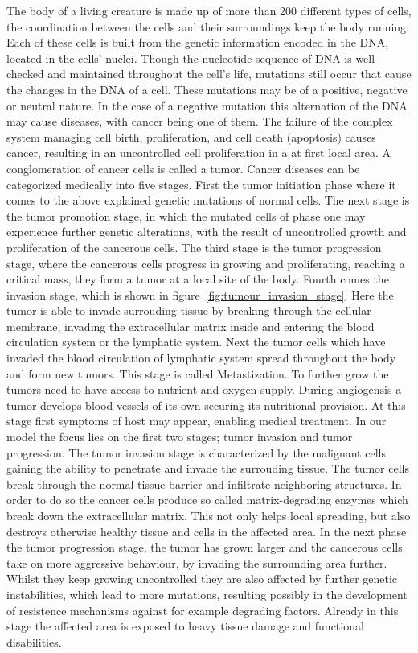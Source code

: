 The body of a living creature is made up of more than 200 different types of cells, the coordination between the cells and their surroundings keep the body running. Each of these cells is built from the genetic information encoded in the DNA, located in the cells' nuclei. Though the nucleotide sequence of DNA is well checked and maintained throughout the cell's life, mutations still occur that cause the changes in the DNA of a cell. These mutations may be of a positive, negative or neutral nature. In the case of a negative mutation this alternation of the DNA may cause diseases, with cancer being one of them. The failure of the complex system managing cell birth, proliferation, and cell death (apoptosis) causes cancer, resulting in an uncontrolled cell proliferation in a at first local area. A conglomeration of cancer cells is called a tumor. \newline
Cancer diseases can be categorized medically into five stages. First the tumor initiation phase where it comes to the above explained genetic mutations of normal cells. The next stage is the tumor promotion stage, in which the mutated cells of phase one may experience further genetic alterations, with the result of uncontrolled growth and proliferation of the cancerous cells. The third stage is the tumor progression stage, where the cancerous cells progress in growing and proliferating, reaching a critical mass, they form a tumor at a local site of the body. Fourth comes the invasion stage, which is shown in figure~\ref{fig:tumour_invasion_stage}. Here the tumor is able to invade surrouding tissue by breaking through the cellular membrane, invading the extracellular matrix inside and entering the blood circulation system or the lymphatic system. Next the tumor cells which have invaded the blood circulation of lymphatic system spread throughout the body and form new tumors. This stage is called Metastization. To further grow the tumors need to have access to nutrient and oxygen supply. During angiogensis a tumor develops blood vessels of its own securing its nutritional provision. At this stage first symptoms of host may appear, enabling medical treatment.\newline
In our model the focus lies on the first two stages; tumor invasion and tumor progression. The tumor invasion stage is characterized by the malignant cells gaining the ability to penetrate and invade the surrouding tissue. The tumor cells break through the normal tissue barrier and infiltrate neighboring structures. In order to do so the cancer cells produce so called matrix-degrading enzymes which break down the extracellular matrix. This not only helps local spreading, but also destroys otherwise healthy tissue and cells in the affected area. In the next phase the tumor progression stage, the tumor has grown larger and the cancerous cells take on more aggressive behaviour, by invading the surrounding area further. Whilst they keep growing uncontrolled they are also affected by further genetic instabilities, which lead to more mutations, resulting possibly in the development of resistence mechanisms against for example degrading factors. Already in this stage the affected area is exposed to heavy tissue damage and functional disabilities.\newline
